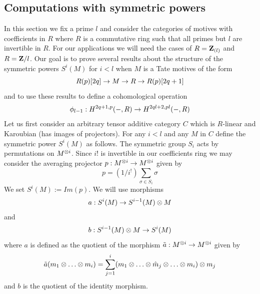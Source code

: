 \documentclass[11pt]{article}
\begin{document}
\subsection{Computations with symmetric powers}
%
In this section we fix a prime $l$ and consider the categories of
motives with coefficients in ${R}$ where $R$ is a commutative ring
such that all primes but $l$ are invertible in ${R}$. For our
applications we will need the cases of $R={\bf Z\rm}_{(l)}$ and
$R={\bf Z\rm}/l$. Our goal is to prove several results about the structure of
the symmetric powers $S^i(M)$ for $i<l$ when $M$ is a Tate motives of
the form
%
$${{R}}(p)[2q]\rightarrow M\rightarrow {{R}}\rightarrow {{R}}(p)[2q+1]$$
%
and to use these results to define a cohomological operation
%
$$\phi_{l-1}:H^{2q+1,p}(-,R)\rightarrow H^{2ql+2,pl}(-,R)$$
%
Let us first consider an arbitrary tensor additive category $C$ which
is $R$-linear and Karoubian (has images of projectors). For any $i<l$
and any $M$ in $C$ define the symmetric power $S^i(M)$ as follows. The
symmetric group $S_i$ acts by permutations on $M^{\otimes i}$. Since $i!$
is invertible in our coefficients ring we may consider the averaging
projector $p:M^{\otimes i}\rightarrow M^{\otimes i}$ given by
%
$$p=(1/i^!)\sum_{\sigma\in S_i} \sigma$$
%
We set $S^i(M):=Im(p)$. We will use morphisms
%
$$a:S^i(M)\rightarrow S^{i-1}(M)\otimes M$$
%
and
%
$$b:S^{i-1}(M)\otimes M\rightarrow S^{i}(M)$$
%
where $a$ is defined as the quotient of the morphism $\tilde{a}:M^{\otimes
i}\rightarrow M^{\otimes i}$ given by
%
$$\tilde{a}(m_1\oo\dots\oo m_i)=\sum_{j=1}^i (m_1\oo\dots\oo
\hat{m}_j\oo\dots\oo m_i)\oo m_j$$
%
and $b$ is the quotient of the identity morphism. 
%
\end{document}

